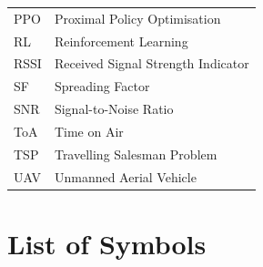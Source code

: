 \begin{longtable}{ll}
    PPO     & Proximal Policy Optimisation \\
    RL      & Reinforcement Learning \\
    RSSI    & Received Signal Strength Indicator \\
    SF      & Spreading Factor \\
    SNR     & Signal-to-Noise Ratio \\
    ToA     & Time on Air \\
    TSP     & Travelling Salesman Problem \\
    UAV     & Unmanned Aerial Vehicle \\
\end{longtable}

\clearpage

\section*{List of Symbols}

